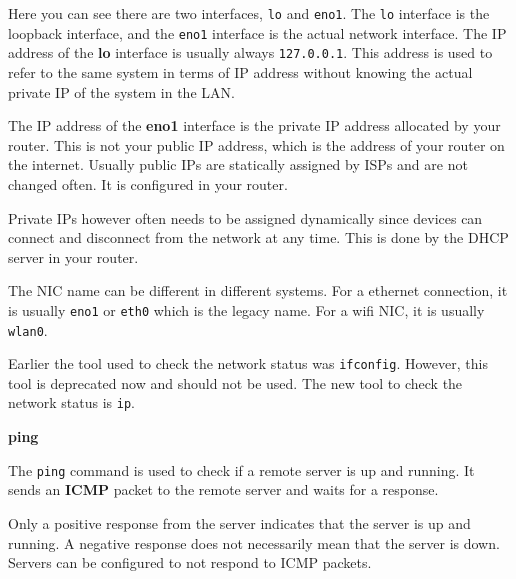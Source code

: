 Here you can see there are two interfaces, \texttt{lo}
and \texttt{eno1}. The \texttt{lo} interface is the
loopback interface, and the \texttt{eno1} interface
is the actual network interface. The IP address of
the \textbf{lo} interface is usually always \texttt{127.0.0.1}.
This address is used to refer to the same system in terms
of IP address without knowing the actual private IP of
the system in the LAN.

The IP address of the \textbf{eno1} interface is the
private IP address allocated by your router. This is
not your public IP address, which is the address of
your router on the internet. Usually public IPs are
statically assigned by ISPs and are not changed often.
It is configured in your router.

Private IPs however often needs to be assigned dynamically
since devices can connect and disconnect from the network
at any time. This is done by the DHCP server in your router.

\begin{remark}
The NIC name can be different in different systems.
For a ethernet connection, it is usually \texttt{eno1}
or \texttt{eth0} which is the legacy name. For a wifi
NIC, it is usually \texttt{wlan0}.
\end{remark}

\begin{remark}
  Earlier the tool used to check the network status
  was \texttt{ifconfig}. However, this tool is deprecated
  now and should not be used. The new tool to check the
  network status is \texttt{ip}.
\end{remark}

\textbf{ping}

The \texttt{ping} command is used to check if a remote
server is up and running. It sends an \textbf{ICMP}
packet to the remote server and waits for a response.

\begin{remark}
  Only a positive response from the server indicates
  that the server is up and running. A negative response
  does not necessarily mean that the server is down.
  Servers can be configured to not respond to ICMP packets.
\end{remark}

